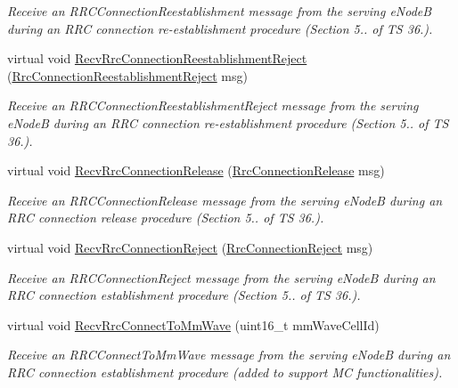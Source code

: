\begin{DoxyCompactItemize}
\begin{DoxyCompactList}\small\item\em Receive an {\itshape R\+R\+C\+Connection\+Reestablishment} message from the serving e\+NodeB during an R\+RC connection re-\/establishment procedure (Section 5.. of TS 36.). \end{DoxyCompactList}\item 
virtual void \hyperlink{classns3_1_1MemberLteUeRrcSapProvider_a77b2393292da8674706f297d7984c916}{Recv\+Rrc\+Connection\+Reestablishment\+Reject} (\hyperlink{structns3_1_1LteRrcSap_1_1RrcConnectionReestablishmentReject}{Rrc\+Connection\+Reestablishment\+Reject} msg)
\begin{DoxyCompactList}\small\item\em Receive an {\itshape R\+R\+C\+Connection\+Reestablishment\+Reject} message from the serving e\+NodeB during an R\+RC connection re-\/establishment procedure (Section 5.. of TS 36.). \end{DoxyCompactList}\item 
virtual void \hyperlink{classns3_1_1MemberLteUeRrcSapProvider_a2548ec3b319db52a3ee9d5b1e9e5bae4}{Recv\+Rrc\+Connection\+Release} (\hyperlink{structns3_1_1LteRrcSap_1_1RrcConnectionRelease}{Rrc\+Connection\+Release} msg)
\begin{DoxyCompactList}\small\item\em Receive an {\itshape R\+R\+C\+Connection\+Release} message from the serving e\+NodeB during an R\+RC connection release procedure (Section 5.. of TS 36.). \end{DoxyCompactList}\item 
virtual void \hyperlink{classns3_1_1MemberLteUeRrcSapProvider_a08c209e4c28a9f52e7269eb3b9ee1eb2}{Recv\+Rrc\+Connection\+Reject} (\hyperlink{structns3_1_1LteRrcSap_1_1RrcConnectionReject}{Rrc\+Connection\+Reject} msg)
\begin{DoxyCompactList}\small\item\em Receive an {\itshape R\+R\+C\+Connection\+Reject} message from the serving e\+NodeB during an R\+RC connection establishment procedure (Section 5.. of TS 36.). \end{DoxyCompactList}\item 
virtual void \hyperlink{classns3_1_1MemberLteUeRrcSapProvider_a654670126fbb6418169cf3da6ea2a4a0}{Recv\+Rrc\+Connect\+To\+Mm\+Wave} (uint16\+\_\+t mm\+Wave\+Cell\+Id)
\begin{DoxyCompactList}\small\item\em Receive an {\itshape R\+R\+C\+Connect\+To\+Mm\+Wave} message from the serving e\+NodeB during an R\+RC connection establishment procedure (added to support MC functionalities). \end{DoxyCompactList}\item 

\end{DoxyCompactItemize}
